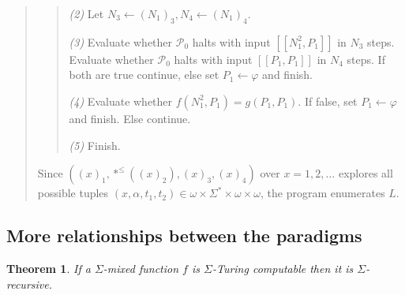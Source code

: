 \documentclass[a4paper, 12pt]{article}
\newtheorem{theorem}{Theorem}
\newtheorem{theorem}{Theorem}
\begin{document}
\begin{quote}
\begin{quote}
    \textit{(2)} Let $N_3 \leftarrow (N_1)_3, N_4 \leftarrow (N_1)_4$.

    \textit{(3)} Evaluate whether $\mathcal{P}_0$ halts with input $[\![ N_1^2,
    P_1]\!]$ in $N_3$ steps. Evaluate whether $\mathcal{P}_0$ halts with input
    $[\![ P_1, P_1 ]\!]$ in $N_4$ steps. If both are true continue, else
    set $P_1 \leftarrow \varphi$ and finish.

    \textit{(4)} Evaluate whether $f( N_1^2 , P_1 ) = g(P_1, P_1)$. If false,
    set $P_1 \leftarrow \varphi$ and finish. Else continue. 

    \textit{(5)} Finish.
\end{quote}

Since $\left( (x)_1, *^{\leq} \left( (x)_2 \right), (x)_3, (x)_4  \right) $ over
$x = 1, 2, \ldots$ explores all possible tuples $(x, \alpha, t_1, t_2) \in
\omega \times \Sigma^{*} \times \omega \times \omega$, the program enumerates
$L$.

\end{quote}
\normalsize

\subsection{More relationships between the paradigms}

\begin{theorem}
    If a $\Sigma$-mixed function $f$ is $\Sigma$-Turing computable then it is
    $\Sigma$-recursive.
\end{theorem}
\end{document}
